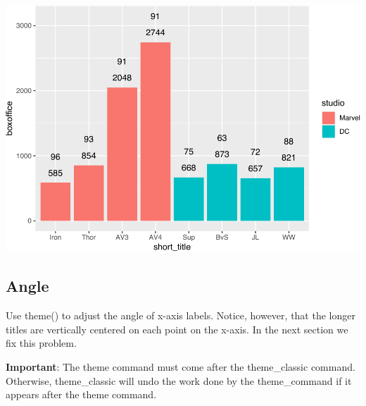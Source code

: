\documentclass[
]{krantz}
\begin{document}
\includegraphics[width=0.65\linewidth]{bookdown_files/figure-latex/unnamed-chunk-267-1}

\hypertarget{angle}{%
\subsection{Angle}\label{angle}}

Use theme() to adjust the angle of x-axis labels. Notice, however, that the longer titles are vertically centered on each point on the x-axis. In the next section we fix this problem.

\textbf{Important}: The theme command must come after the theme\_classic command. Otherwise, theme\_classic will undo the work done by the theme\_command if it appears after the theme command.
\end{document}
